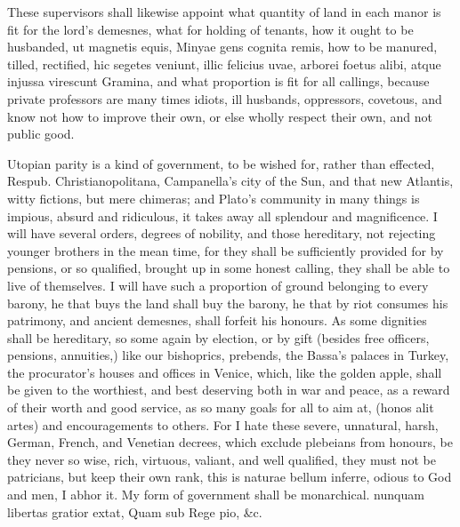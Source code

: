 {These supervisors shall likewise appoint what quantity of land in each
manor is fit for the lord's demesnes, what for holding of tenants,
how it ought to be husbanded, ut magnetis equis, Minyae gens
cognita remis, how to be manured, tilled, rectified, hic segetes
veniunt, illic felicius uvae, arborei foetus alibi, atque injussa
virescunt Gramina, and what proportion is fit for all callings, because
private professors are many times idiots, ill husbands, oppressors,
covetous, and know not how to improve their own, or else wholly respect
their own, and not public good.

Utopian parity is a kind of government, to be wished for, rather
than effected, Respub. Christianopolitana, Campanella's city of the
Sun, and that new Atlantis, witty fictions, but mere chimeras; and
Plato's community in many things is impious, absurd and ridiculous, it
takes away all splendour and magnificence. I will have several orders,
degrees of nobility, and those hereditary, not rejecting younger
brothers in the mean time, for they shall be sufficiently provided for
by pensions, or so qualified, brought up in some honest calling, they
shall be able to live of themselves. I will have such a proportion of
ground belonging to every barony, he that buys the land shall buy the
barony, he that by riot consumes his patrimony, and ancient demesnes,
shall forfeit his honours. As some dignities shall be hereditary,
so some again by election, or by gift (besides free officers, pensions,
annuities,) like our bishoprics, prebends, the Bassa's palaces in
Turkey, the procurator's houses and offices in Venice, which, like
the golden apple, shall be given to the worthiest, and best deserving
both in war and peace, as a reward of their worth and good service, as
so many goals for all to aim at, (honos alit artes) and encouragements
to others. For I hate these severe, unnatural, harsh, German, French,
and Venetian decrees, which exclude plebeians from honours, be they
never so wise, rich, virtuous, valiant, and well qualified, they must
not be patricians, but keep their own rank, this is naturae bellum
inferre, odious to God and men, I abhor it. My form of government shall
be monarchical.
nunquam libertas gratior extat,
Quam sub Rege pio, \&c.

}
